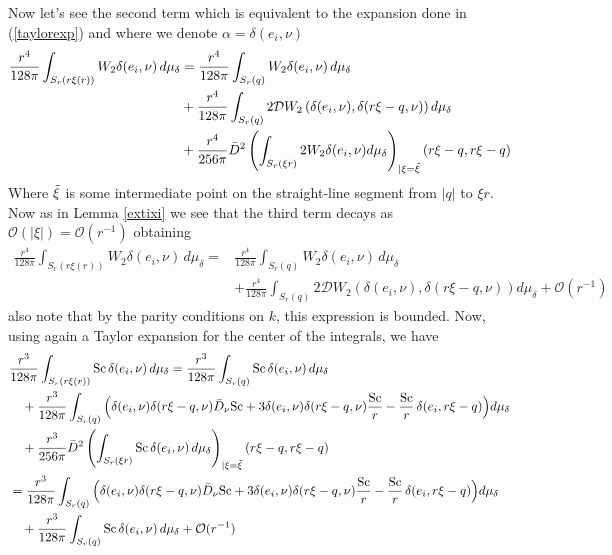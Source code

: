\documentclass[12pt,a4paper]{amsart}
\theoremstyle{plain}
\theoremstyle{definition}
\begin{document}
Now let's see the second term which is equivalent to the  expansion done in (\ref{taylorexp}) and where we denote   $ \alpha=  \delta( e_i, \nu )$ 
\begin{equation*}
    \begin{split}
        \frac{r^4}{128 \pi}  \int_{S_r(r \xi(r))} W_2 \delta( e_i, \nu ) \, d\mu_{\delta}&=    \frac{r^4}{128 \pi}  \int_{S_r(q)}  W_2 \delta( e_i, \nu )  \, d\mu_{\delta}  \\
        &+\frac{r^4}{128 \pi}  \int_{S_{r}(q)}   2 \mathcal{D}W_2\left( \delta( e_i, \nu ),  \delta( r\xi-q, \nu ) \right) d\mu_{\delta} \\
 & + \frac{r^4}{ 256 \pi}  \Bar{D}^2 \left(\int_{S_{r}(\xi r)}  2 W_2 \delta( e_i, \nu ) d\mu_{\delta}\right)_{|\xi = \Tilde{\xi}}(r \xi-q, r \xi-q)
    \end{split}
\end{equation*}
Where $\Tilde{\xi}$ is  some intermediate point on the straight‐line segment from  $|q|$ to $  \xi r $. Now as in Lemma \ref{extixi} we see that the  third term decays as $\mathcal{O}(|\xi|)= \mathcal{O}(r^{-1})$ obtaining 
\begin{equation*}
\begin{split}
     \frac{r^4}{128 \pi}  \int_{S_r(r \xi(r))} W_2 \delta( e_i, \nu ) \, d\mu_{\delta} =&   \frac{r^4}{128 \pi}  \int_{S_r(q)}  W_2 \delta( e_i, \nu )  \, d\mu_{\delta} \\ &+\frac{r^4}{128 \pi}  \int_{S_{r}(q)}   2 \mathcal{D}W_2\left( \delta( e_i, \nu ),  \delta( r\xi-q, \nu ) \right) d\mu_{\delta} +\mathcal{O}(r^{-1})
     \end{split}
\end{equation*}
also note that by the parity conditions on $k$, this expression is bounded.  Now, using again a Taylor expansion for the center of the integrals, we have 
\begin{equation}
    \begin{split}
        &\frac{r^3}{128 \pi}  \int_{S_r(r \xi(r))} \mathrm{Sc} \, \delta( e_i, \nu )   \, d\mu_{\delta} =\frac{r^3}{128 \pi}  \int_{S_r(q)} \mathrm{Sc}\, \delta( e_i, \nu )   \, d\mu_{\delta} \\
        &\quad+ \frac{r^3}{128 \pi}  \int_{S_r(q)}  \Big(  \delta( e_i, \nu )  \delta(  r\xi-q, \nu ) \Bar{D}_{\nu} \mathrm{Sc}+ 3 \delta( e_i, \nu ) \delta(  r\xi-q, \nu ) \frac{\mathrm{Sc}}{r}  - \frac{\mathrm{Sc}}{r} \, \delta( e_i,r\xi-q ) \Big) d\mu_{\delta}\\
        &\quad + \frac{r^3}{256 \pi}  \Bar{D}^2 \left(\int_{S_{r}(\xi r)}  \mathrm{Sc}\,  \delta( e_i, \nu )   \, d\mu_{\delta}\right)_{|\xi = \Tilde{\xi}}(r \xi-q, r \xi-q)\\
        &=    \frac{r^3}{128 \pi}  \int_{S_r(q)}  \Big(  \delta( e_i, \nu )  \delta(  r\xi-q, \nu ) \Bar{D}_{\nu} \mathrm{Sc}+ 3 \delta( e_i, \nu ) \delta(  r\xi-q, \nu ) \frac{\mathrm{Sc}}{r}  - \frac{\mathrm{Sc}}{r} \, \delta( e_i,r\xi-q ) \Big)  d\mu_{\delta}\\
        &\quad + \frac{r^3}{128 \pi}  \int_{S_r(q)} \mathrm{Sc}\, \delta( e_i, \nu )   \, d\mu_{\delta} + \mathcal{O}(r^{-1})
    \end{split}
\end{equation}
\end{document}
